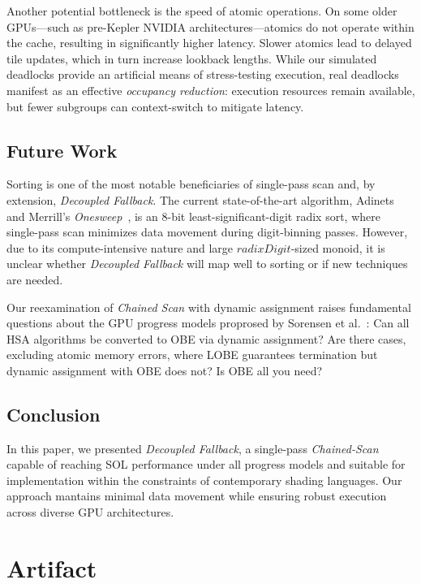 \documentclass[sigconf]{acmart}
\begin{document}
Another potential bottleneck is the speed of atomic operations. On some older GPUs—such as pre-Kepler NVIDIA architectures—atomics do not operate within the cache, resulting in significantly higher latency. Slower atomics lead to delayed tile updates, which in turn increase lookback lengths. While our simulated deadlocks provide an artificial means of stress-testing execution, real deadlocks manifest as an effective \emph{occupancy reduction}: execution resources remain available, but fewer subgroups can context-switch to mitigate latency.

\subsection{Future Work}
Sorting is one of the most notable beneficiaries of single-pass scan and, by extension, \emph{Decoupled Fallback}. The current state-of-the-art algorithm, Adinets and Merrill’s \emph{Onesweep}~\cite{adinets2022onesweepfastersignificantdigit}, is an 8-bit least-significant-digit radix sort, where single-pass scan minimizes data movement during digit-binning passes. However, due to its compute-intensive nature and large $radixDigit$-sized monoid, it is unclear whether \emph{Decoupled Fallback} will map well to sorting or if new techniques are needed.

Our reexamination of \emph{Chained Scan} with dynamic assignment raises fundamental questions about the GPU progress models proprosed by Sorensen et al.~\cite{sorensen2021}: Can all HSA algorithms be converted to OBE via dynamic assignment? Are there cases, excluding atomic memory errors, where LOBE guarantees termination but dynamic assignment with OBE does not? Is OBE all you need?

\subsection{Conclusion}
In this paper, we presented \emph{Decoupled Fallback}, a single-pass \emph{Chained-Scan} capable of reaching SOL performance under all progress models and suitable for implementation within the constraints of contemporary shading languages. Our approach mantains minimal data movement while ensuring robust execution across diverse GPU architectures.

\begin{acks}
\end{acks}

\clearpage
\appendix
\section{Artifact}
\end{document}
